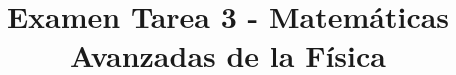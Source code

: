 
\usepackage{standalone}
\usepackage{tikz}   
\usepackage{tikz-3dplot}
\usetikzlibrary{decorations.pathmorphing,patterns}
\usepackage{enumerate}
\usepackage{hyperref}
\usepackage{float}
\usepackage{fancyhdr}
\pagestyle{fancy}
\fancyhf{}
\rfoot{\thepage}
\renewcommand{\headrulewidth}{0.5pt}
\setlength{\headheight}{30pt} 
\title{Examen Tarea 3 - Matemáticas Avanzadas de la Física}
\date{ }

\vspace{-4cm}
\renewcommand\labelenumii{\theenumi.{\arabic{enumii}}}
\maketitle
\fontsize{14}{14}\selectfont
